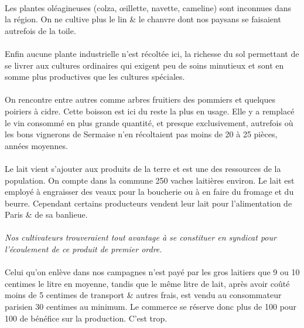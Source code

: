 \documentclass[../eBook.tex]{subfiles}
\begin{document}
    \paragraph{}Les plantes oléagineuses (colza, \oe illette, navette, cameline) sont inconnues dans la région. On ne cultive plus le lin \& le chanvre dont nos paysans se faisaient autrefois de la toile.
    \paragraph{}Enfin aucune plante industrielle n'est récoltée ici, la richesse du sol permettant de se livrer aux cultures ordinaires qui exigent peu de soins minutieux et sont en somme plus productives que les cultures spéciales.
    \paragraph{}On rencontre entre autres comme arbres fruitiers des pommiers et quelques poiriers à cidre. Cette boisson est ici du reste la plus en usage. Elle y a remplacé le vin consommé en plus grande quantité, et presque exclusivement, autrefois où les bons vignerons de Sermaise n'en récoltaient pas moins de 20 à 25 pièces, années moyennes.
    \paragraph{}Le lait vient s'ajouter aux produits de la terre et est une des ressources de la population. On compte dans la commune 250 vaches laitières environ. Le lait est employé à engraisser des veaux pour la boucherie ou à en faire du fromage et du beurre. Cependant certains producteurs vendent leur lait pour l'alimentation de Paris \& de sa banlieue.
    \paragraph{}\textit{Nos cultivateurs trouveraient tout avantage à se constituer en syndicat pour l'écoulement de ce produit de premier ordre.}
    \paragraph{}Celui qu'on enlève dans nos campagnes n'est payé par les gros laitiers que 9 ou 10 centimes le litre en moyenne, tandis que le même litre de lait, après avoir coûté moins de 5 centimes de transport \& autres frais, est vendu au consommateur parisien 30 centimes au minimum. Le commerce se réserve donc plus de 100 pour 100 de bénéfice sur la production. C'est trop.
\end{document}
